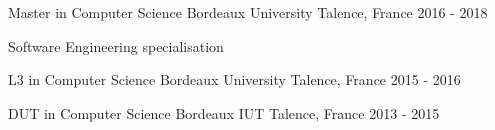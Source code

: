 \begin{cventries}

	\cventry
	{Master in Computer Science}
	{Bordeaux University}
	{Talence, France}
	{2016 - 2018}
	{
		\begin{cvitems}
		\item {Software Engineering specialisation}
		\end{cvitems}
	}

	\cventry
	{L3 in Computer Science}
	{Bordeaux University}
	{Talence, France}
	{2015 - 2016}
	{}
	
	\cventry
	{DUT in Computer Science}
	{Bordeaux IUT}
	{Talence, France}
	{2013 - 2015}
	{}

\end{cventries}